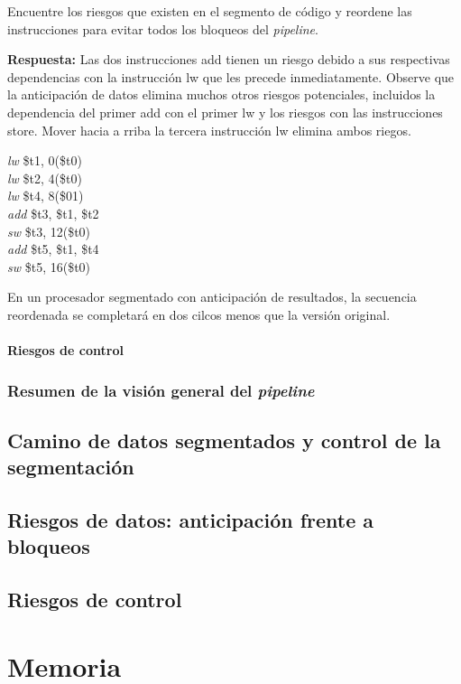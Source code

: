 \documentclass[12pt,a4paper]{report}
\begin{document}
				\par Encuentre los riesgos que existen en el segmento de código y reordene las instrucciones para evitar todos los bloqueos del \textit{pipeline}.

				\par \textbf{Respuesta:} Las dos instrucciones add tienen un riesgo debido a sus respectivas dependencias con la instrucción lw que les precede inmediatamente. Observe que la anticipación de datos elimina muchos otros riesgos potenciales, incluidos la dependencia del primer add con el primer lw y los riesgos con las instrucciones store. Mover hacia a rriba la tercera instrucción lw elimina ambos riegos.
				\begin{center}
					\textit{lw} \qquad \$t1, 0(\$t0) \\
					\textit{lw} \qquad \$t2, 4(\$t0) \\
					\textit{lw} \qquad \$t4, 8(\$01) \\
					\textit{add} \qquad \$t3, \$t1, \$t2 \\
					\textit{sw} \qquad \$t3, 12(\$t0) \\
					\textit{add} \qquad \$t5, \$t1, \$t4 \\
					\textit{sw} \qquad \$t5, 16(\$t0)
				\end{center}
				
				\par En un procesador segmentado con anticipación de resultados, la secuencia reordenada se completará en dos cilcos menos que la versión original.

			\subsubsection{Riesgos de control}
				\par

		\subsection{Resumen de la visión general del \textit{pipeline}}

	\section{Camino de datos segmentados y control de la segmentación}

	\section{Riesgos de datos: anticipación frente a bloqueos}

	\section{Riesgos de control}

\chapter{Memoria}
\end{document}
